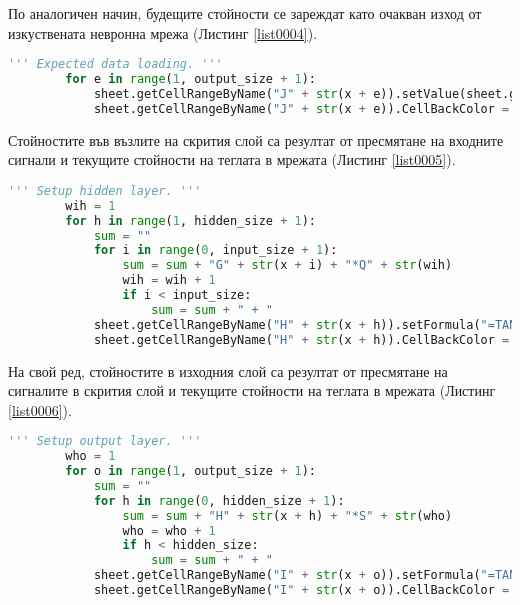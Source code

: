 По аналогичен начин, будещите стойности се зареждат като очакван изход от изкуствената невронна мрежа (Листинг \ref{list0004}).

\begin{lstlisting}[caption=Очакван изход от мрежата, language=Python, basicstyle=\tiny, label=list0004]
        ''' Expected data loading. '''
        for e in range(1, output_size + 1):
            sheet.getCellRangeByName("J" + str(x + e)).setValue(sheet.getCellRangeByName("E" + str(t + e + input_size)).getValue())
            sheet.getCellRangeByName("J" + str(x + e)).CellBackColor = (0 << 16 | 127 << 8 | 0)
\end{lstlisting}

Стойностите във възлите на скрития слой са резултат от пресмятане на входните сигнали и текущите стойности на теглата в мрежата (Листинг \ref{list0005}). 

\begin{lstlisting}[caption=Стойности на скрития слой при правия пас, language=Python, basicstyle=\tiny, label=list0005]
        ''' Setup hidden layer. '''
        wih = 1
        for h in range(1, hidden_size + 1):
            sum = ""
            for i in range(0, input_size + 1):
                sum = sum + "G" + str(x + i) + "*Q" + str(wih)
                wih = wih + 1
                if i < input_size:
                    sum = sum + " + "
            sheet.getCellRangeByName("H" + str(x + h)).setFormula("=TANH( " + sum + " )")
            sheet.getCellRangeByName("H" + str(x + h)).CellBackColor = (0 << 16 | 0 << 8 | 255)
\end{lstlisting}

На свой ред, стойностите в изходния слой са резултат от пресмятане на сигналите в скрития слой и текущите стойности на теглата в мрежата (Листинг \ref{list0006}).

\begin{lstlisting}[caption=Стойности на изходния слой при правия пас, language=Python, basicstyle=\tiny, label=list0006]
        ''' Setup output layer. '''
        who = 1
        for o in range(1, output_size + 1):
            sum = ""
            for h in range(0, hidden_size + 1):
                sum = sum + "H" + str(x + h) + "*S" + str(who)
                who = who + 1
                if h < hidden_size:
                    sum = sum + " + "
            sheet.getCellRangeByName("I" + str(x + o)).setFormula("=TANH( " + sum + " )")
            sheet.getCellRangeByName("I" + str(x + o)).CellBackColor = (0 << 16 | 255 << 8 | 0)
\end{lstlisting}

